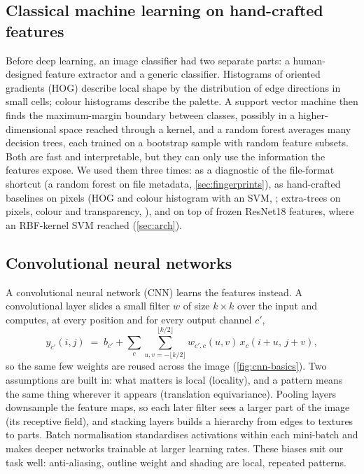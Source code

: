 \subsection{Classical machine learning on hand-crafted features}
Before deep learning, an image classifier had two separate parts: a human-designed feature extractor and a generic classifier. Histograms of oriented gradients (HOG) \cite{dalal2005hog} describe local shape by the distribution of edge directions in small cells; colour histograms describe the palette. A support vector machine \cite{cortes1995svm} then finds the maximum-margin boundary between classes, possibly in a higher-dimensional space reached through a kernel, and a random forest \cite{breiman2001rf} averages many decision trees, each trained on a bootstrap sample with random feature subsets. Both are fast and interpretable, but they can only use the information the features expose. We used them three times: as a diagnostic of the file-format shortcut (a random forest on file metadata, \cref{sec:fingerprints}), as hand-crafted baselines on pixels (HOG and colour histogram with an SVM, ; extra-trees on pixels, colour and transparency, ), and on top of frozen ResNet18 features, where an RBF-kernel SVM reached  (\cref{sec:arch}).

\subsection{Convolutional neural networks}
A convolutional neural network (CNN) \cite{lecun1998gradient,krizhevsky2012alexnet} learns the features instead. A convolutional layer slides a small filter $w$ of size $k\times k$ over the input and computes, at every position and for every output channel $c'$,
\begin{equation}
  y_{c'}(i,j) \;=\; b_{c'} + \sum_{c}\sum_{u,v=-\lfloor k/2\rfloor}^{\lfloor k/2\rfloor} w_{c',c}(u,v)\, x_c(i+u,\, j+v),
\end{equation}
so the same few weights are reused across the image (\cref{fig:cnn-basics}). Two assumptions are built in: what matters is local (locality), and a pattern means the same thing wherever it appears (translation equivariance). Pooling layers downsample the feature maps, so each later filter sees a larger part of the image (its receptive field), and stacking layers builds a hierarchy from edges to textures to parts. Batch normalisation \cite{ioffe2015batchnorm} standardises activations within each mini-batch and makes deeper networks trainable at larger learning rates. These biases suit our task well: anti-aliasing, outline weight and shading are local, repeated patterns.

